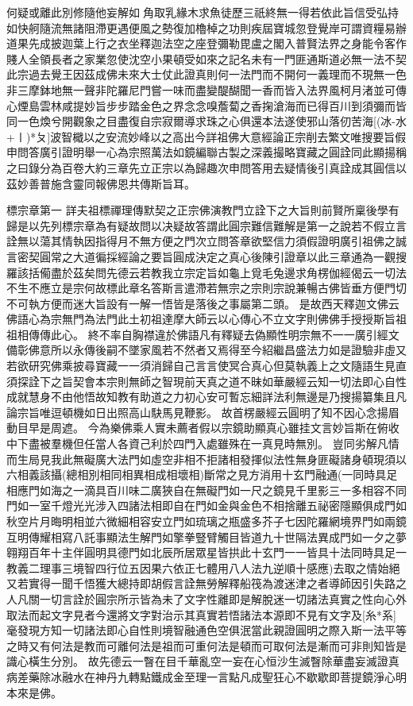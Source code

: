 何疑或離此別修隨他妄解如𤚲角取乳緣木求魚徒歷三祇終無一得若依此旨信受弘持如快舸隨流無諸阻滯更遇便風之勢復加櫓棹之功則疾屆寶城忽登覺岸可謂資糧易辦道果先成披迦葉上行之衣坐釋迦法空之座登彌勒毘盧之閣入普賢法界之身能令客作賤人全領長者之家業忽使沈空小果頓受如來之記名未有一門匪通斯道必無一法不契此宗過去覺王因茲成佛未來大士仗此證真則何一法門而不開何一義理而不現無一色非三摩鉢地無一聲非陀羅尼門嘗一味而盡變醍醐聞一香而皆入法界風柯月渚並可傳心煙島雲林咸提妙旨步步踏金色之界念念嗅薝蔔之香掬滄海而已得百川到須彌而皆同一色煥兮開觀象之目盡復自宗寂爾導求珠之心俱還本法遂使邪山落仞苦海[(冰-水+〡)*ㄆ]波智檝以之安流妙峰以之高出今詳祖佛大意經論正宗削去繁文唯搜要旨假申問答廣引證明舉一心為宗照萬法如鏡編聯古製之深義撮略寶藏之圓詮同此顯揚稱之曰錄分為百卷大約三章先立正宗以為歸趣次申問答用去疑情後引真詮成其圓信以茲妙善普施含靈同報佛恩共傳斯旨耳。




標宗章第一
詳夫祖標禪理傳默契之正宗佛演教門立詮下之大旨則前賢所稟後學有歸是以先列標宗章為有疑故問以决疑故答謂此圓宗難信難解是第一之說若不假立言詮無以蕩其情執因指得月不無方便之門次立問答章欲堅信力須假證明廣引祖佛之誠言密契圓常之大道徧採經論之要旨圓成決定之真心後陳引證章以此三章通為一觀搜羅該括僃盡於茲矣問先德云若教我立宗定旨如龜上覓毛兔邊求角楞伽經偈云一切法不生不應立是宗何故標此章名答斯言遣滯若無宗之宗則宗說兼暢古佛皆垂方便門切不可執方便而迷大旨設有一解一悟皆是落後之事屬第二頭。
是故西天釋迦文佛云佛語心為宗無門為法門此土初祖達摩大師云以心傳心不立文字則佛佛手授授斯旨祖祖相傳傳此心。
終不率自胸襟違於佛語凡有釋疑去偽顯性明宗無不一一廣引經文備彰佛意所以永傳後嗣不墜家風若不然者又焉得至今紹繼昌盛法力如是證驗非虛又若欲研究佛乘披尋寶藏一一須消歸自己言言使冥合真心但莫執義上之文隨語生見直須探詮下之旨契會本宗則無師之智現前天真之道不昧如華嚴經云知一切法即心自性成就慧身不由他悟故知教有助道之力初心安可暫忘細詳法利無邊是乃搜揚纂集且凡論宗旨唯逗頓機如日出照高山駃馬見鞭影。
故首楞嚴經云圓明了知不因心念揚眉動目早是周遮。
今為樂佛乘人實未薦者假以宗鏡助顯真心雖挂文言妙旨斯在俯收中下盡被羣機但任當人各資己利於四門入處雖殊在一真見時無別。
豈同劣解凡情而生局見我此無礙廣大法門如虛空非相不拒諸相發揮似法性無身匪礙諸身頓現須以六相義該攝(總相別相同相異相成相壞相)斷常之見方消用十玄門融通(一同時具足相應門如海之一滴具百川味二廣狹自在無礙門如一尺之鏡見千里影三一多相容不同門如一室千燈光光涉入四諸法相即自在門如金與金色不相捨離五祕密隱顯俱成門如秋空片月晦明相並六微細相容安立門如琉璃之瓶盛多芥子七因陀羅網境界門如兩鏡互明傳耀相寫八託事顯法生解門如擎拳豎臂觸目皆道九十世隔法異成門如一夕之夢翱翔百年十主伴圓明具德門如北辰所居眾星皆拱此十玄門一一皆具十法同時具足一教義二理事三境智四行位五因果六依正七體用八人法九逆順十感應)去取之情始絕又若實得一聞千悟獲大總持即胡假言詮無勞解釋船筏為渡迷津之者導師因引失路之人凡關一切言詮於圓宗所示皆為未了文字性離即是解脫迷一切諸法真實之性向心外取法而起文字見者今還將文字對治示其真實若悟諸法本源即不見有文字及[糸*系]毫發現方知一切諸法即心自性則境智融通色空俱泯當此親證圓明之際入斯一法平等之時又有何法是教而可離何法是祖而可重何法是頓而可取何法是漸而可非則知皆是識心橫生分別。
故先德云一瞖在目千華亂空一妄在心恒沙生滅瞖除華盡妄滅證真病差藥除冰融水在神丹九轉點鐵成金至理一言點凡成聖狂心不歇歇即菩提鏡淨心明本來是佛。

